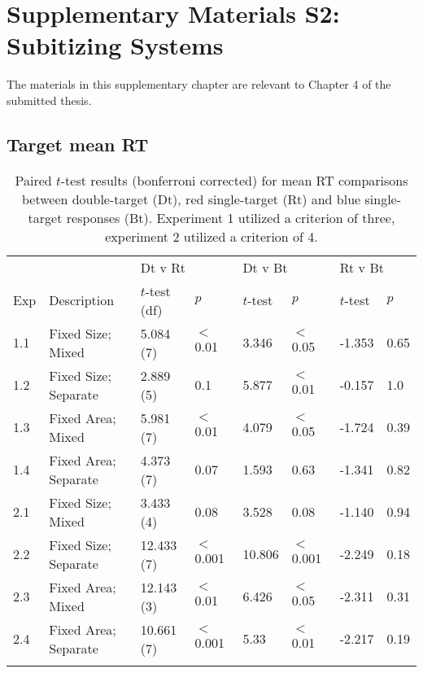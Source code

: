 \chapter{Supplementary Materials S2: \\ Subitizing Systems}
\label{Appendix:B_SubitizingSystems}

\noindent The materials in this supplementary chapter are relevant to Chapter 4 of the submitted thesis.
\setcounter{equation}{0}
\setcounter{figure}{0}
\setcounter{table}{0}
\setcounter{section}{0}
\renewcommand\thefigure{S2\thesection.\arabic{figure}}
\renewcommand\thetable{S2\thesection.\arabic{table}}

\newpage

\section{Target mean RT}

\begin{table}[htb]
\centering
\caption{Paired $t$-test results (bonferroni corrected) for mean RT comparisons between double-target (Dt), red single-target (Rt) and blue single-target responses (Bt). Experiment 1 utilized a criterion of three, experiment 2 utilized a criterion of 4.}
\begin{tabular}{ l l l l l l l l} 
\hline
\multicolumn{2}{c}{} & \multicolumn{2}{l}{Dt v Rt} &\multicolumn{2}{l}{Dt v Bt} & \multicolumn{2}{l}{Rt v Bt} \\ \cline{3-8}
Exp & Description & $t$-test (df) & $p$ & $t$-test & $p$ & $t$-test & $p$ \\
\hline
1.1 & Fixed Size; Mixed     & 5.084 (7) & $<$ 0.01 & 3.346 & $<$ 0.05 & -1.353 & 0.65 \\
1.2 & Fixed Size; Separate  & 2.889 (5) & 0.1 & 5.877 & $<$ 0.01 & -0.157 & 1.0 \\
1.3 & Fixed Area; Mixed     & 5.981 (7) & $<$ 0.01 & 4.079 & $<$ 0.05 & -1.724 & 0.39 \\
1.4 & Fixed Area; Separate  & 4.373 (7) & 0.07 & 1.593 & 0.63 & -1.341 & 0.82 \\
\hline
2.1 & Fixed Size; Mixed     & 3.433 (4) & 0.08 & 3.528 & 0.08 & -1.140 & 0.94 \\
2.2 & Fixed Size; Separate  & 12.433 (7) & $<$ 0.001 & 10.806 & $<$ 0.001 & -2.249 & 0.18 \\
2.3 & Fixed Area; Mixed     & 12.143 (3) & $<$ 0.01 & 6.426 & $<$ 0.05 & -2.311 & 0.31 \\
2.4 & Fixed Area; Separate  & 10.661 (7) & $<$ 0.001 & 5.33 & $<$ 0.01 & -2.217 & 0.19 \\
\hline
\hline
\label{tab:Sub_ttests}
\end{tabular} 
\end{table}

